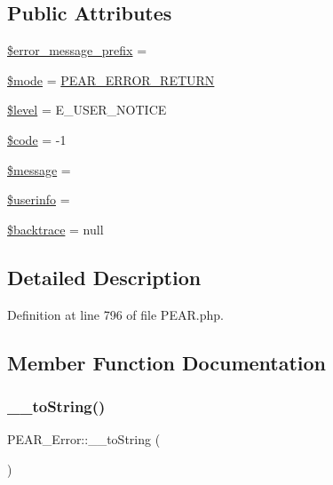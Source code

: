 \subsection*{Public Attributes}
\begin{DoxyCompactItemize}
\item 
\hyperlink{classPEAR__Error_aea8e8d491c90daabbc7de7ef8d9eef2d}{\$error\+\_\+message\+\_\+prefix} = \textquotesingle{}\textquotesingle{}
\item 
\hyperlink{classPEAR__Error_a37fd8f51c6a1a0df165b7e36c88fbea7}{\$mode} = \hyperlink{PEAR_8php_a90d8915cb5b94d81cd4e1efa9c75c66a}{P\+E\+A\+R\+\_\+\+E\+R\+R\+O\+R\+\_\+\+R\+E\+T\+U\+RN}
\item 
\hyperlink{classPEAR__Error_a3fad062a32df55f9bd17af007e16cd49}{\$level} = E\+\_\+\+U\+S\+E\+R\+\_\+\+N\+O\+T\+I\+CE
\item 
\hyperlink{classPEAR__Error_ae7c2938ab048474acaa2755a0161da3e}{\$code} = -\/1
\item 
\hyperlink{classPEAR__Error_a21cd38ff638a63b3d6506d994bc488df}{\$message} = \textquotesingle{}\textquotesingle{}
\item 
\hyperlink{classPEAR__Error_ad201e08b4f3faace7a729ccf2744fdee}{\$userinfo} = \textquotesingle{}\textquotesingle{}
\item 
\hyperlink{classPEAR__Error_a8b3d92f4ec98d4af469e38a8f1030ff4}{\$backtrace} = null
\end{DoxyCompactItemize}


\subsection{Detailed Description}


Definition at line 796 of file P\+E\+A\+R.\+php.



\subsection{Member Function Documentation}
\hypertarget{classPEAR__Error_a82c4bf3c440d5b8663b214d799d08d74}{}\label{classPEAR__Error_a82c4bf3c440d5b8663b214d799d08d74} 
\subsubsection{\texorpdfstring{\+\_\+\+\_\+to\+String()}{\_\_toString()}}
{\footnotesize\ttfamily P\+E\+A\+R\+\_\+\+Error\+::\+\_\+\+\_\+to\+String (\begin{DoxyParamCaption}{ }\end{DoxyParamCaption})}




